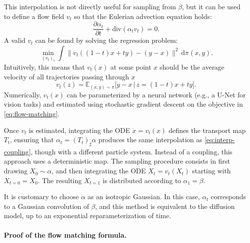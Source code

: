 This interpolation is not directly useful for sampling from $\beta$, but it can be used to define a flow field $v_t$ so that the Eulerian advection equation holds:
\begin{equation}
    \frac{\partial \alpha_t}{\partial t} + \mathrm{div}(\alpha_t v_t) = 0. \label{eq:eulerian-advection}
\end{equation}
A valid $v_t$ can be found by solving the regression problem:
\begin{equation}
    \min_{(v_t)_t} \int \|v_t((1-t)x + ty) - (y - x)\|^2 \, \mathrm{d}\pi(x, y). \label{eq:flow-matching}
\end{equation}
Intuitively, this means that $v_t(x)$ at some point $x$ should be the average velocity of all trajectories passing through $x$
\begin{equation*}\label{eq:flow-match-conditional}
		v_t(z) = \mathbb{E}_{(x, y) \sim \pi} \big[ y - x \, \big| \, z = (1-t)x + t y \big].
\end{equation*}
Numerically, $v_t(x)$ can be parameterized by a neural network (e.g., a U-Net for vision tasks) and estimated using stochastic gradient descent on the objective in \eqref{eq:flow-matching}.

Once $v_t$ is estimated, integrating the ODE $\dot{x} = v_t(x)$ defines the transport map $T_t$, ensuring that $\alpha_t = (T_t)_\sharp \alpha$ produces the same interpolation as \eqref{eq:interp-coupling}, though with a different particle system. Instead of a coupling, this approach uses a deterministic map.
The sampling procedure consists in first drawing $X_0 \sim \alpha$, and then integrating the ODE $\dot{X}_t = v_t(X_t)$ starting with $X_{t=0} = X_0$. 
The resulting $X_{t=1}$ is distributed according to $\alpha_1 = \beta$.

It is customary to choose $\alpha$ as an isotropic Gaussian. In this case, $\alpha_t$ corresponds to a Gaussian convolution of $\beta$, and this method is equivalent to the diffusion model, up to an exponential reparameterization of time.

\paragraph{Proof of the flow matching formula.}

